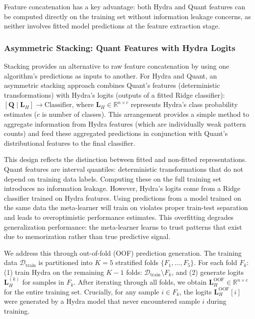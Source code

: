 \documentclass[pdflatex,sn-basic]{sn-jnl}           %
\theoremstyle{thmstyleone}%
\theoremstyle{thmstyletwo}%
\theoremstyle{thmstylethree}%
\begin{document}
Feature concatenation has a key advantage: both Hydra and Quant features can be computed directly on the training set without information leakage concerns, as neither involves fitted model predictions at the feature extraction stage.

\subsubsection{Asymmetric Stacking: Quant Features with Hydra Logits}

Stacking \citep{stacked-generalization} provides an alternative to raw feature concatenation by using one algorithm's predictions as inputs to another. For Hydra and Quant, an asymmetric stacking approach combines Quant's features (deterministic transformations) with Hydra's logits (outputs of a fitted Ridge classifier): $[\mathbf{Q} \mid \mathbf{L}_H] \rightarrow \text{Classifier}$, where $\mathbf{L}_H \in \mathbb{R}^{n \times c}$ represents Hydra's class probability estimates ($c$ is number of classes). This arrangement provides a simple method to aggregate information from Hydra features (which are individually weak pattern counts) and feed these aggregated predictions in conjunction with Quant's distributional features to the final classifier.

This design reflects the distinction between fitted and non-fitted representations. Quant features are interval quantiles: deterministic transformations that do not depend on training data labels. Computing these on the full training set introduces no information leakage. However, Hydra's logits come from a Ridge classifier trained on Hydra features. Using predictions from a model trained on the same data the meta-learner will train on violates proper train-test separation and leads to overoptimistic performance estimates. This overfitting degrades generalization performance: the meta-learner learns to trust patterns that exist due to memorization rather than true predictive signal.

We address this through out-of-fold (OOF) prediction generation. The training data $\mathcal{D}_{\text{train}}$ is partitioned into $K=5$ stratified folds $\{F_1, ..., F_5\}$. For each fold $F_k$: (1) train Hydra on the remaining $K-1$ folds: $\mathcal{D}_{\text{train}} \setminus F_k$, and (2) generate logits $\mathbf{L}_H^{(k)}$ for samples in $F_k$. After iterating through all folds, we obtain $\mathbf{L}_H^{\text{OOF}} \in \mathbb{R}^{n \times c}$ for the entire training set. Crucially, for any sample $i \in F_k$, the logits $\mathbf{L}_H^{\text{OOF}}[i]$ were generated by a Hydra model that never encountered sample $i$ during training.
\end{document}
